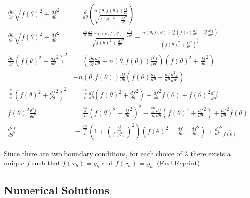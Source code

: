 \documentclass{article}
\begin{document}
\begin{align} 
\frac{\partial n}{\partial r} \sqrt{f(\theta)^2 + \frac{df}{d\theta}^2}
& = \frac{d}{d\theta} \left( 
	\frac{n(\theta, f(\theta)) \frac{df}{d\theta}}
		{\sqrt{f(\theta)^2 + \frac{df}{d\theta}^2}} 
\right) \nonumber \\
\frac{\partial n}{\partial r} \sqrt{f(\theta)^2 + \frac{df}{d\theta}^2}
& = \frac{\frac{\partial n}{\partial r} \frac{df}{d\theta} 
		+ n(\theta, f(\theta)) \frac{\partial^2 f}{\partial \theta^2}}
	{\sqrt{f(\theta)^2 + \frac{df}{d\theta}^2}}
	- \frac{n(\theta, f(\theta)) \frac{df}{d\theta} 
		\left( f(\theta) \frac{df}{d\theta} 
			+ \frac{df}{d\theta} \frac{d^2f}{d\theta^2}
		\right)}
		{\left( f(\theta)^2 + \frac{df}{d\theta}^2 \right)^{\frac32}} \nonumber\\
\frac{\partial n}{\partial r} \left( f(\theta)^2 + \frac{df}{d\theta}^2 \right)^2
& = \left( \frac{\partial n}{\partial r} \frac{df}{d\theta} 
		+ n(\theta, f(\theta)) \frac{\partial^2 f}{\partial \theta^2}\right)
	\left(f(\theta)^2 + \frac{df}{d\theta}^2\right) \nonumber \\
& - n(\theta, f(\theta)) \frac{df}{d\theta} 
		\left( f(\theta) \frac{df}{d\theta} 
			+ \frac{df}{d\theta} \frac{d^2f}{d\theta^2}
		\right) \nonumber\\
\frac{\frac{\partial n}{\partial r}}n 
	\left( f(\theta)^2 + \frac{df}{d\theta}^2 \right)^2
& = \frac{\frac{\partial n}{\partial r}}n \frac{df}{d\theta} 
	\left(f(\theta)^2 + \frac{df}{d\theta}^2\right)
	- \frac{df}{d\theta}^2
		f(\theta) 
	+ f(\theta)^2 \frac{d^2f}{d\theta^2} \nonumber\\
f(\theta)^2 \frac{d^2f}{d\theta^2}
& = \frac{\frac{\partial n}{\partial r}}n 
		\left( f(\theta)^2 + \frac{df}{d\theta}^2 \right)^2
    - \frac{\frac{\partial n}{\partial r}}n \frac{df}{d\theta} 
		\left(f(\theta)^2 + \frac{df}{d\theta}^2\right)
	+ \frac{df}{d\theta}^2
		f(\theta) \nonumber \\
\frac{d^2f}{d\theta^2}
& = \frac{\frac{\partial n}{\partial r}}n 
	\left(1 + \left(\frac{\frac{df}{d\theta}}{f(\theta)}\right)^2\right)
	\left( f(\theta)^2 - \frac{df}{d\theta} + \frac{df}{d\theta}^2 \right)
	+ \frac{df}{d\theta}^2
		\frac{1}{f(\theta)} 
\end{align}

Since there are two boundary conditions, for each choice of $\lambda$ there
	exists a unique $f$ such that $f(x_b) = y_b$ and $f(x_a) = y_a$.
(End Reprint)

\subsection{Numerical Solutions}
\end{document}
